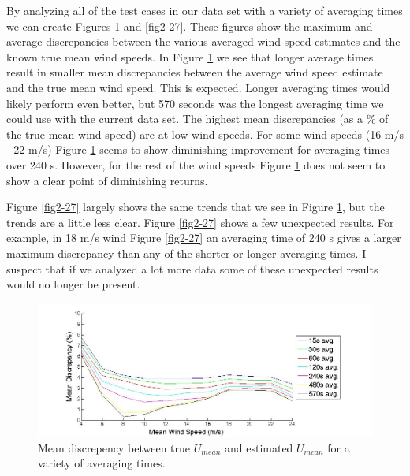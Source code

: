 By analyzing all of the test cases in our data set with a variety of averaging times we can create Figures \ref{fig2-26} and \ref{fig2-27}. These figures show the maximum and average discrepancies between the various averaged wind speed estimates and the known true mean wind speeds. In Figure \ref{fig2-26} we see that longer average times result in smaller mean discrepancies between the average wind speed estimate and the true mean wind speed. This is expected. Longer averaging times would likely perform even better, but 570 seconds was the longest averaging time we could use with the current data set. The highest mean discrepancies (as a \% of the true mean wind speed) are at low wind speeds. For some wind speeds (16 m/s - 22 m/s) Figure \ref{fig2-26} seems to show diminishing improvement for averaging times over 240 s. However, for the rest of the wind speeds Figure \ref{fig2-26} does not seem to show a clear point of diminishing returns.

Figure \ref{fig2-27} largely shows the same trends that we see in Figure \ref{fig2-26}, but the trends are a little less clear. Figure \ref{fig2-27} shows a few unexpected results. For example, in 18 m/s wind Figure \ref{fig2-27} an averaging time of 240 s gives a larger maximum discrepancy than any of the shorter or longer averaging times. I suspect that if we analyzed a lot more data some of these unexpected results would no longer be present.



\begin{figure}[ht]
	\centering
		\includegraphics[width = \linewidth]{Figures/ch2Figures/fig2-26.jpg}
		
	\caption{Mean discrepency between true $U_{mean}$ and estimated $U_{mean}$ for a variety of averaging times.}
	\label{fig2-26}
\end{figure}

